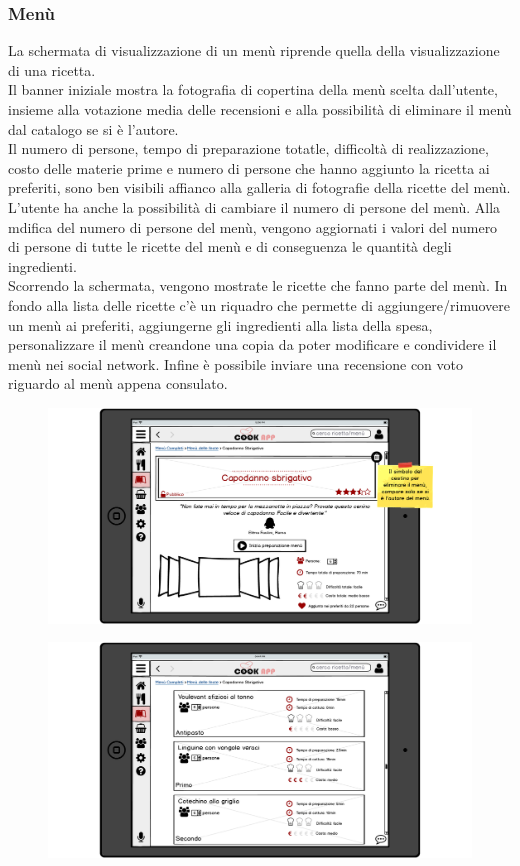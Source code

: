 \subsubsection{Menù}
La schermata di visualizzazione di un menù riprende quella della
visualizzazione di una ricetta.\\ 
Il banner iniziale mostra la fotografia di copertina della menù scelta
dall'utente, insieme alla votazione media delle recensioni e alla
possibilità di eliminare il menù dal catalogo se si è l'autore.\\
Il numero di persone, tempo di preparazione totatle, difficoltà di
realizzazione, costo delle materie prime e numero di persone che hanno
aggiunto la ricetta ai preferiti, sono ben visibili affianco alla
galleria di fotografie della ricette del menù. L'utente ha anche la
possibilità di cambiare il numero di persone del menù. Alla mdifica del
numero di persone del menù, vengono aggiornati i valori del numero di
persone di tutte le ricette del menù e di conseguenza le quantità degli
ingredienti.\\
Scorrendo la schermata, vengono mostrate le ricette che fanno parte del
menù. In fondo alla lista delle ricette c'è un riquadro che permette di
aggiungere/rimuovere un menù ai preferiti, aggiungerne gli ingredienti
alla lista della spesa, personalizzare il menù creandone una copia da
poter modificare e condividere il menù nei social network.
Infine è possibile inviare una recensione con voto riguardo al menù
appena consulato.\\
\begin{figure}[H]
	\centering
	\includegraphics[width=0.95\linewidth]{img/mockup/menu-overview-1.png}
\end{figure}
\begin{figure}[H]
	\centering
	\includegraphics[width=0.95\linewidth]{img/mockup/menu-overview-2.png}
\end{figure}
